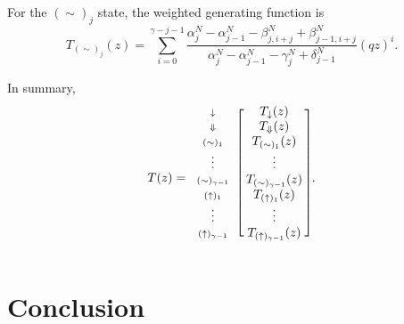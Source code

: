 \documentclass{article}
\newcommand{\DN}{\scriptstyle{\Downarrow}}
\newcommand{\dn}{\scriptstyle{\downarrow}}
\newcommand{\up}[1]{\scriptstyle{(\uparrow)_{#1}}}
\newcommand{\eq}[1]{\scriptstyle{(\sim)_{#1}}}
\begin{document}
For the $(\sim)_j$ state, the weighted generating function is
\begin{equation}
T_{(\sim)_j}(z) = \sum_{i=0}^{\gamma-j-1}
\frac{ \alpha_j^N-\alpha_{j-1}^N-\beta_{j,i+j}^N +\beta_{j-1,i+j}^N }
{\alpha_j^N-\alpha_{j-1}^N-\gamma_j^N+\delta_{j-1}^N} (qz)^i.
\end{equation}

In summary,
\begin{equation*}
T(z) = 
\begin{blockarray}{cc}
\begin{block}{c[c]}
\dn & T_\downarrow(z) \\
\DN & T_\Downarrow(z) \\
\eq{1} & T_{(\sim)_1}(z) \\
\vdots & \vdots \\
\eq{\gamma-1} & T_{(\sim)_{\gamma-1}}(z) \\
\up{1} & T_{(\uparrow)_1}(z) \\
\vdots & \vdots \\
\up{\gamma-1} & \; T_{(\uparrow)_{\gamma-1}}(z) \; \\
\end{block}
\end{blockarray}.
\end{equation*}


\section{Conclusion}
\end{document}
